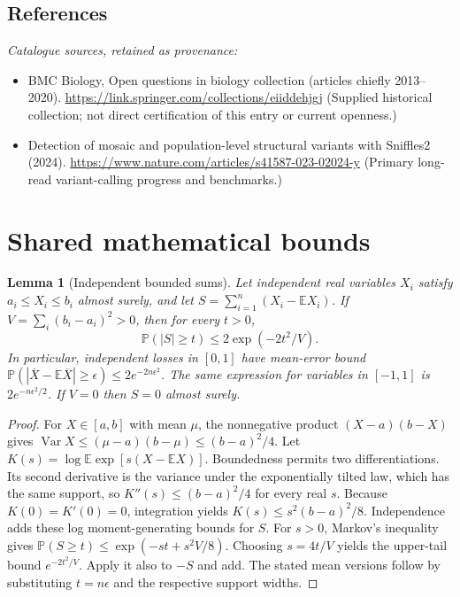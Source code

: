 \documentclass[11pt]{article}
\newcommand{\E}{\mathbb E}
\newcommand{\Prob}{\mathbb P}
\DeclareMathOperator{\Var}{Var}
\providecommand{\E}{\mathbb E}
\providecommand{\Prob}{\mathbb P}
\providecommand{\Var}{\operatorname{Var}}
\newtheorem{sharedlemma}{Lemma}[section]
\begin{document}
\subsection{References}
\noindent\emph{Catalogue sources, retained as provenance:}
\begin{itemize}
\item BMC Biology, Open questions in biology collection (articles chiefly 2013--2020). \url{https://link.springer.com/collections/eiiddehjgj} (Supplied historical collection; not direct certification of this entry or current openness.)
\item Detection of mosaic and population-level structural variants with Sniffles2 (2024). \url{https://www.nature.com/articles/s41587-023-02024-y} (Primary long-read variant-calling progress and benchmarks.)
\end{itemize}
\clearpage


\appendix
\section{Shared mathematical bounds}\label{app:bounds}
\begin{sharedlemma}[Independent bounded sums]\label{lem:bounded}
Let independent real variables $X_i$ satisfy $a_i\leq X_i\leq b_i$ almost surely,
and let $S=\sum_{i=1}^n(X_i-\E X_i)$. If
$V=\sum_i(b_i-a_i)^2>0$, then for every $t>0$,
\[
 \Prob(|S|\geq t)\leq 2\exp(-2t^2/V).
\]
In particular, independent losses in $[0,1]$ have mean-error bound
$\Prob(|\overline X-\E\overline X|\geq\epsilon)
\leq2e^{-2n\epsilon^2}$. The same expression for variables in $[-1,1]$
is $2e^{-n\epsilon^2/2}$. If $V=0$ then $S=0$ almost surely.
\end{sharedlemma}
\begin{proof}
For $X\in[a,b]$ with mean $\mu$, the nonnegative product
$(X-a)(b-X)$ gives
$\Var X\leq(\mu-a)(b-\mu)\leq(b-a)^2/4$.
Let $K(s)=\log\E\exp[s(X-\E X)]$.
Boundedness permits two differentiations. Its second derivative is the variance
under the exponentially tilted law, which has the same support, so
$K''(s)\leq(b-a)^2/4$ for every real $s$.
Because $K(0)=K'(0)=0$, integration yields
$K(s)\leq s^2(b-a)^2/8$.
Independence adds these log moment-generating bounds for $S$.
For $s>0$, Markov's inequality gives
$\Prob(S\geq t)\leq\exp(-st+s^2V/8)$.
Choosing $s=4t/V$ yields the upper-tail bound $e^{-2t^2/V}$.
Apply it also to $-S$ and add. The stated mean versions follow by substituting
$t=n\epsilon$ and the respective support widths.
\end{proof}
\end{document}
